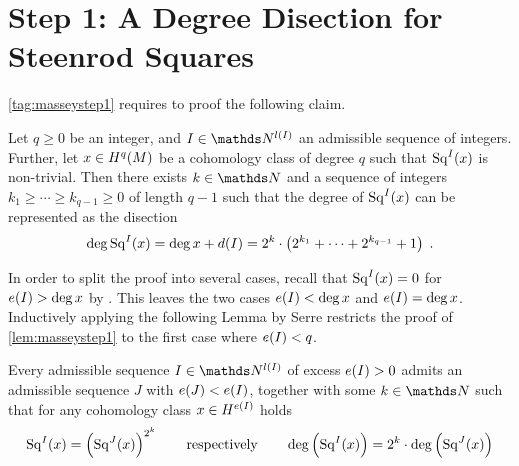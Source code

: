 \section[Degree Disection for Steenrod Squares]
{Step 1: A Degree Disection for Steenrod Squares}
\ref{tag:masseystep1} requires to proof the following claim.
\begin{Lem}[\ref{tag:masseystep1}]\label{lem:masseystep1}
  Let $q\geq 0$ be an integer,
  and $I\in\Nat^{\l(I)}$ an admissible sequence of integers.
  Further, let $x\in H^q(M)$ be a cohomology class of degree $q$
  such that $\mathrm{Sq}^{I}(x)$ is non-trivial.
  Then there exists $k\in\Nat$ and a sequence of integers
  $k_1\geq\dotsb\geq k_{q-1}\geq0$ of length $q-1$ such that the
  degree of $\mathrm{Sq}^{I}(x)$ can be represented as the disection
  \begin{gather*}
    \deg \mathrm{Sq}^{I}(x)
    = \deg x + d(I)
    = 2^k\cdot
    \left( 2^{k_1}+\dotsb+2^{k_{q-1}} + 1 \right)
    \;.
  \end{gather*}
\end{Lem}

In order to split the proof into several cases, recall that
$\mathrm{Sq}^{I}(x) = 0$ for $e(I)>\deg x$ by
. This leaves the two cases
$e(I)<\deg x$ and $e(I)=\deg x$.
Inductively applying the following Lemma by Serre restricts the
proof of \autoref{lem:masseystep1} to the first case where $e(I)<q$.
\begin{Lem}[Serre]
  \label{lem:serre}
  Every admissible sequence $I\in\Nat^{\l(I)}$ of excess $e(I)>0$
  admits an admissible sequence $J$ with $e(J)<e(I)$,
  together with some $k\in\Nat$
  such that for any cohomology class $x\in H^{e(I)}$ holds
  \begin{gather*}
    \mathrm{Sq}^{I}(x) = \left(\mathrm{Sq}^{J}(x)\right) ^{2^k}
    \qquad\text{respectively}\qquad
    \deg\left(\mathrm{Sq}^{I}(x)\right) = 2^k\cdot \deg\left(\mathrm{Sq}^{J}(x)\right)
  \end{gather*}
\end{Lem}

